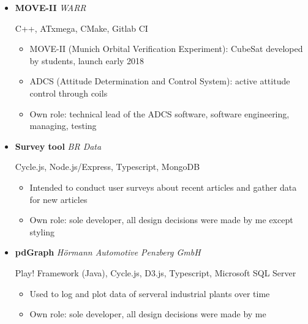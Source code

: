 \documentclass[11pt,a4paper,sans]{moderncv}        %
\begin{document}
\begin{itemize}

\item{\textbf{MOVE-II} \textit{WARR}

\small{C++, ATxmega, CMake, Gitlab CI}

\vspace{3pt}

\begin{small}
\begin{itemize}
\item{MOVE-II (Munich Orbital Verification Experiment): CubeSat developed by students, launch early 2018}
\item{ADCS (Attitude Determination and Control System): active attitude control through coils}
\item{Own role: technical lead of the ADCS software, software engineering, managing, testing}
\end{itemize}
\end{small}
}

\vspace{6pt}

\item{\textbf{Survey tool} \textit{BR Data}

\small{Cycle.js, Node.js/Express, Typescript, MongoDB}

\begin{small}
\begin{itemize}
\item{Intended to conduct user surveys about recent articles and gather data for new articles}
\item{Own role: sole developer, all design decisions were made by me except styling}
\end{itemize}
\end{small}
}

\vspace{6pt}

\item{\textbf{pdGraph} \textit{Hörmann Automotive Penzberg GmbH}

\small{Play! Framework (Java), Cycle.js, D3.js, Typescript, Microsoft SQL Server}

\begin{small}
\begin{itemize}
\item{Used to log and plot data of serveral industrial plants over time}
\item{Own role: sole developer, all design decisions were made by me}
\end{itemize}
\end{small}

}

\end{itemize}
\end{document}
